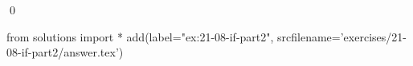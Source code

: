 
\begin{ex}
  \label{ex:21-08-if-part2}
  
  \qed
\end{ex}
\begin{python0}
from solutions import *
add(label="ex:21-08-if-part2",
    srcfilename='exercises/21-08-if-part2/answer.tex')
\end{python0}
